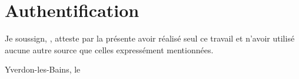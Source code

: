 
\chapter*{Authentification}

Je soussign, \theauthor, atteste par la présente avoir réalisé seul ce travail et n'avoir utilisé aucune autre source que celles expressément mentionnées.

\vfil
{\relax\theauthor\par
    \ifdefined\thesignature
        \printsignature

    \fi
}
\vfil
Yverdon-les-Bains, le \thedate